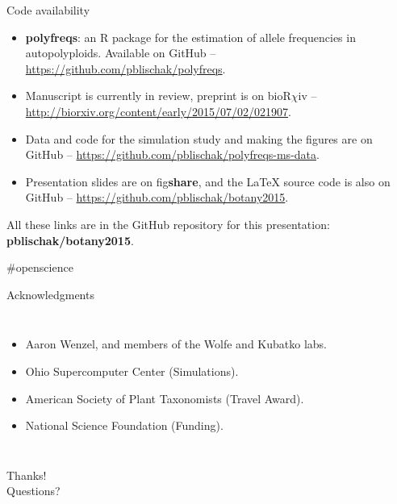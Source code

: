 \documentclass[presentation,serif]{beamer}
\begin{document}
\begin{frame}[t,plain]{Code availability}
	\fontsize{10pt}{10}\selectfont
	\begin{itemize}
		\item \textbf{polyfreqs}: an R package for the estimation of allele frequencies in autopolyploids. Available on GitHub -- \url{https://github.com/pblischak/polyfreqs}.
		\vspace{0.2in}

		\item Manuscript is currently in review, preprint is on bioR$\chi$iv -- \url{http://biorxiv.org/content/early/2015/07/02/021907}.
		\vspace{0.2in}

		\item Data and code for the simulation study and making the figures are on GitHub -- \url{https://github.com/pblischak/polyfreqs-ms-data}.
		\vspace{0.2in}

		\item Presentation slides are on fig\textbf{share}, and the \LaTeX{} source code is also on GitHub -- \url{https://github.com/pblischak/botany2015}.
	\end{itemize}
	\vspace{0.15in}

	{\Large \alert{All these links are in the GitHub repository for this presentation: \textbf{pblischak/botany2015}.}}

	\hfill {\tiny \#openscience}
\end{frame}

\begin{frame}[t,plain]{Acknowledgments}
	\begin{columns}[onlytextwidth]
	\begin{itemize}
		\item Aaron Wenzel, and members of the Wolfe and Kubatko labs.
		\item Ohio Supercomputer Center (Simulations).
		\item American Society of Plant Taxonomists (Travel Award).
		\item National Science Foundation (Funding).
	\end{itemize}

	\begin{center}
	\end{center}
	\end{columns}
\end{frame}

\begin{frame}[c,plain]{}
	\begin{center}
		{\Huge Thanks!}\\
		\vspace{0.5in}
		{\LARGE Questions?}
	\end{center}
\end{frame}
\end{document}

